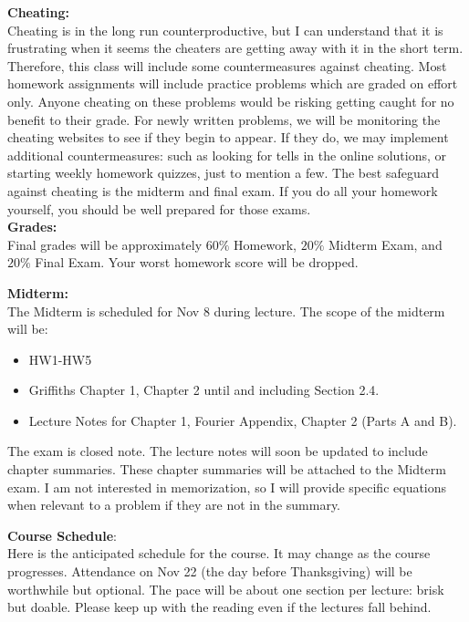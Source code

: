 \documentclass[12pt]{article}
\begin{document}
\noindent
\textbf{Cheating:}\\
Cheating is in the long run counterproductive, but I can understand that it is frustrating when it seems the cheaters are getting away with it in the short term.  Therefore, this class will include some countermeasures against cheating.  Most homework assignments will include practice problems which are graded on effort only.  Anyone cheating on these problems would be risking getting caught for no benefit to their grade.  For newly written problems, we will be monitoring the cheating websites to see if they begin to appear.  If they do, we may implement additional countermeasures: such as looking for tells in the online solutions, or starting weekly homework quizzes, just to mention a few.  The best safeguard against cheating is the midterm and final exam.  If you do all your homework yourself, you should be well prepared for those exams.\\

\noindent
\textbf {Grades:}\\
Final grades will be approximately $60\%$ Homework, $20\%$ Midterm Exam, and
$20\%$ Final Exam.  Your worst homework score will be dropped.\\
\noindent

\noindent
\textbf {Midterm:}\\
The Midterm is scheduled for Nov 8 during lecture.  The scope of the midterm will be:
\begin{itemize}
\item HW1-HW5
\item Griffiths Chapter 1, Chapter 2 until and including Section 2.4.
\item Lecture Notes for Chapter 1, Fourier Appendix, Chapter 2 (Parts A and B). 
\end{itemize}
The exam is closed note.  The lecture notes will soon be updated to include chapter summaries.  These chapter summaries will be attached to the Midterm exam.  I am not interested in memorization, so I will provide specific equations when relevant to a problem if they are not in the summary.

\newpage

\noindent
\textbf {Course Schedule}:\\
Here is the anticipated schedule for the course.  It may change as the
course progresses.  Attendance on Nov 22 (the day before Thanksgiving) will be worthwhile but optional.
The pace will be about one section per lecture: brisk but doable.  Please keep up with the reading even if the lectures fall behind.\\
\end{document}
